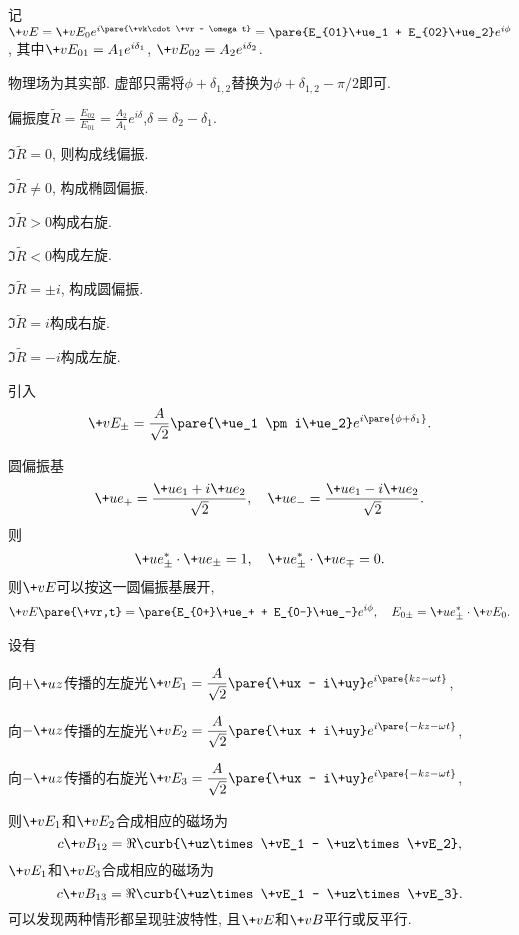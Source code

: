 \documentclass[hidelinks]{ctexart}
\begin{document}
记$\+vE = \+vE_0 e^{i\pare{\+vk\cdot \+vr - \omega t}} = \pare{E_{01}\+ue_1 + E_{02}\+ue_2}e^{i\phi}$, 其中$\+vE_{01} = A_1 e^{i\delta_1}$, $\+vE_{02} = A_2 e^{i\delta_2}$.
\begin{cenum}
    \item 物理场为其实部. 虚部只需将$\phi + \delta_{1,2}$替换为$\phi + \delta_{1,2} - \pi / 2$即可.
    \item 偏振度$\displaystyle \tilde{R} = \frac{E_{02}}{E_{01}} = \frac{A_2}{A_1} e^{i\delta}$,$\delta = \delta_2 - \delta_1$.
    \begin{cenum}
        \item $\Im \tilde{R} = 0$, 则构成线偏振.
        \item $\Im \tilde{R} \neq 0$, 构成椭圆偏振.
        \begin{cenum}
            \item $\Im \tilde{R} > 0$构成右旋.
            \item $\Im \tilde{R} < 0$构成左旋.
        \end{cenum}
        \item $\Im \tilde{R} = \pm i$, 构成圆偏振.
        \begin{cenum}
            \item $\Im \tilde{R} = i$构成右旋.
            \item $\Im \tilde{R} = -i$构成左旋.
        \end{cenum}
    \end{cenum}
    引入
    \[ \+vE_\pm = \frac{A}{\sqrt{2}}\pare{\+ue_1 \pm i\+ue_2}e^{i\pare{\phi + \delta_1}}. \]
    \item 圆偏振基
    \[ \+ue_+ = \frac{\+ue_1 + i\+ue_2}{\sqrt{2}},\quad \+ue_- = \frac{\+ue_1 - i \+ue_2}{\sqrt{2}}. \]
    则
    \[ \+ue_\pm^* \cdot \+ue_\pm = 1,\quad \+ue_\pm^* \cdot \+ue_\mp = 0. \]
    则$\+vE$可以按这一圆偏振基展开,
    \[ \+vE\pare{\+vr,t} = \pare{E_{0+}\+ue_+ + E_{0-}\+ue_-}e^{i\phi},\quad E_{0\pm} = \+ue_{\pm}^*\cdot \+vE_0. \]
\end{cenum}
设有
\begin{cenum}
    \item 向$+\+uz$传播的左旋光$\displaystyle \+vE_1 = \frac{A}{\sqrt{2}}\pare{\+ux - i\+uy} e^{i\pare{kz - \omega t}}$,
    \item 向$-\+uz$传播的左旋光$\displaystyle \+vE_2 = \frac{A}{\sqrt{2}}\pare{\+ux + i\+uy} e^{i\pare{-kz - \omega t}}$,
    \item 向$-\+uz$传播的右旋光$\displaystyle \+vE_3 = \frac{A}{\sqrt{2}}\pare{\+ux - i\+uy} e^{i\pare{-kz - \omega t}}$,
\end{cenum}
则$\+vE_1$和$\+vE_2$合成相应的磁场为
\[ c\+vB_{12} = \Re\curb{\+uz\times \+vE_1 - \+uz\times \+vE_2}, \]
$\+vE_1$和$\+vE_3$合成相应的磁场为
\[ c\+vB_{13} = \Re\curb{\+uz\times \+vE_1 - \+uz\times \+vE_3}. \]
可以发现两种情形都呈现驻波特性, 且$\+vE$和$\+vB$平行或反平行.
\end{document}
